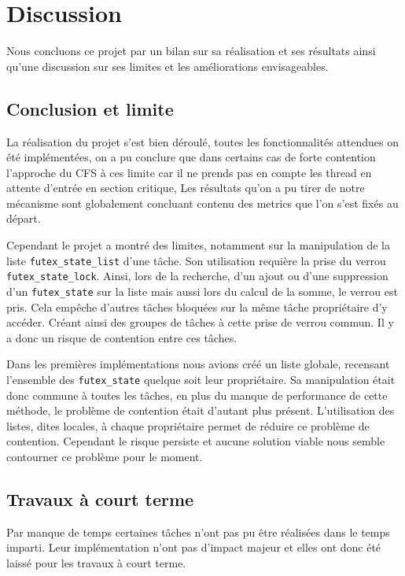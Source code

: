 \section{Discussion}

Nous concluons ce projet par un bilan sur sa réalisation et ses résultats ainsi qu'une discussion sur 
ses limites et les améliorations envisageables.

\subsection{Conclusion et limite}

La réalisation du projet s'est bien déroulé, toutes les fonctionnalités attendues on été
implémentées, on a pu conclure que dans certains cas de forte contention l'approche du CFS à ces limite car il ne prends pas en compte les thread en attente d'entrée en section critique, Les résultats qu'on a pu tirer de notre mécanisme sont globalement concluant contenu des metrics que l'on s'est fixés au départ.

Cependant le projet a montré des limites, notamment sur la manipulation de la liste \verb|futex_state_list| d'une tâche.
Son utilisation requière la prise du verrou \verb|futex_state_lock|.
Ainsi, lors de la recherche, d'un ajout ou d'une suppression d'un \verb|futex_state|
sur la liste mais aussi lors du calcul de la somme, le verrou est pris. Cela empêche d'autres tâches bloquées
sur la même tâche propriétaire d'y accéder. Créant ainsi des groupes de tâches à cette prise de
verrou commun. Il y a donc un risque de contention entre ces tâches.

Dans les premières implémentations nous avions créé un liste globale, recensant l'ensemble des \verb|futex_state| quelque soit
leur propriétaire. Sa manipulation était donc commune à toutes les tâches, en plus du manque de performance de 
cette méthode, le problème de contention était d'autant plus présent. L'utilisation des listes, dites locales, à chaque
propriétaire permet de réduire ce problème de contention. Cependant le risque persiste et aucune solution 
viable nous semble contourner ce problème pour le moment.

\subsection{Travaux à court terme}
Par manque de temps certaines tâches n'ont pas pu être réalisées dans le temps imparti.
Leur implémentation n'ont pas d'impact majeur et elles ont donc été laissé pour les travaux à court terme.

